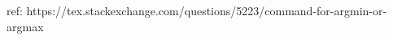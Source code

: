 
\DeclareMathOperator*{\argmin}{arg\,min}

ref: https://tex.stackexchange.com/questions/5223/command-for-argmin-or-argmax

